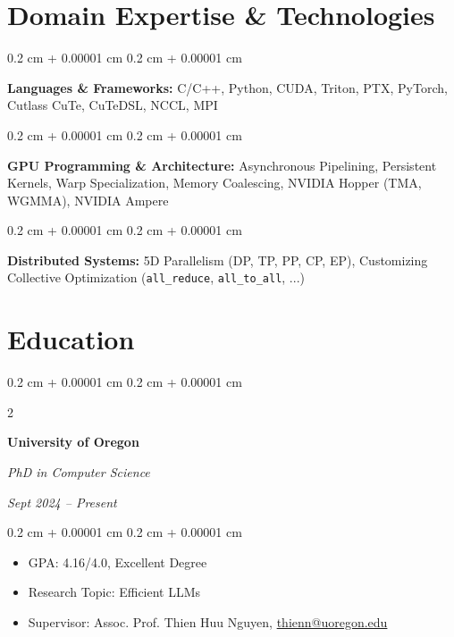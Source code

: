 \documentclass[10pt, letterpaper]{article}
\newenvironment{highlights}{
    \begin{itemize}[
        topsep=0.10 cm,
        parsep=0.10 cm,
        partopsep=0pt,
        itemsep=0pt,
        leftmargin=0.4 cm + 10pt
    ]
}{
    \end{itemize}
} %
\newenvironment{onecolentry}{
    \begin{adjustwidth}{
        0.2 cm + 0.00001 cm
    }{
        0.2 cm + 0.00001 cm
    }
}{
    \end{adjustwidth}
} %
\newenvironment{twocolentry}[2][]{
    \onecolentry
    \def\secondColumn{#2}
    \setcolumnwidth{\fill, 4.5 cm}
    \begin{paracol}{2}
}{
    \switchcolumn \raggedleft \secondColumn
    \end{paracol}
    \endonecolentry
} %
\let\hrefWithoutArrow\href
\renewcommand{\href}[2]{\hrefWithoutArrow{#1}{\ifthenelse{\equal{#2}{}}{ }{#2 }\raisebox{.15ex}{\footnotesize \faExternalLink*}}}
\begin{document}
        \vspace{0.2 cm}

    \section{Domain Expertise \& Technologies}

        \begin{onecolentry}
            \textbf{Languages \& Frameworks:} C/C++, Python, CUDA, Triton, PTX, PyTorch, Cutlass CuTe, CuTeDSL, NCCL, MPI
        \end{onecolentry}

        \vspace{0.2 cm}

        \begin{onecolentry}
            \textbf{GPU Programming \& Architecture:} Asynchronous Pipelining, Persistent Kernels, Warp Specialization, Memory Coalescing, NVIDIA Hopper (TMA, WGMMA), NVIDIA Ampere
        \end{onecolentry}

        \vspace{0.2 cm}

        \begin{onecolentry}
            \textbf{Distributed Systems:} 5D Parallelism (DP, TP, PP, CP, EP), Customizing Collective Optimization (\texttt{all\_reduce}, \texttt{all\_to\_all}, ...)
        \end{onecolentry}

    \section{Education}

        \begin{twocolentry}{

        \textit{Sept 2024 – Present}}
            \textbf{University of Oregon}

            \textit{PhD in Computer Science}

        \end{twocolentry}

        \vspace{0.10 cm}
        \begin{onecolentry}
            \begin{highlights}
                \item GPA: 4.16/4.0, Excellent Degree
                \item Research Topic: Efficient LLMs
                \item Supervisor: Assoc. Prof. Thien Huu Nguyen, \mbox{\hrefWithoutArrow{mailto:thienn@uoregon.edu}{\color{black}thienn@uoregon.edu}}
            \end{highlights}
        \end{onecolentry}
\end{document}
